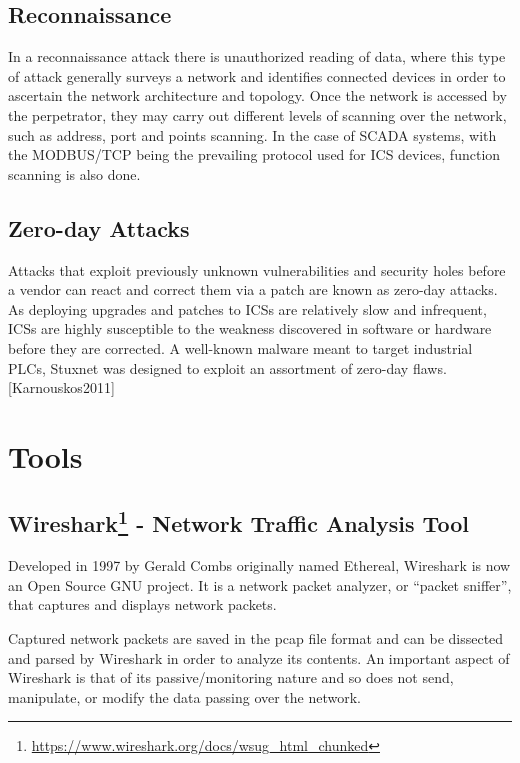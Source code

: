 \documentclass[12pt,]{article}
\begin{document}
\subsection{Reconnaissance}\label{reconnaissance}

In a reconnaissance attack there is unauthorized reading of data, where
this type of attack generally surveys a network and identifies connected
devices in order to ascertain the network architecture and topology.
Once the network is accessed by the perpetrator, they may carry out
different levels of scanning over the network, such as address, port and
points scanning. In the case of SCADA systems, with the MODBUS/TCP being
the prevailing protocol used for ICS devices, function scanning is also
done.

\subsection{Zero-day Attacks}\label{zero-day-attacks}

Attacks that exploit previously unknown vulnerabilities and security
holes before a vendor can react and correct them via a patch are known
as zero-day attacks. As deploying upgrades and patches to ICSs are
relatively slow and infrequent, ICSs are highly susceptible to the
weakness discovered in software or hardware before they are corrected. A
well-known malware meant to target industrial PLCs, Stuxnet was designed
to exploit an assortment of zero-day flaws.{[}Karnouskos2011{]}

\pagebreak

\section{Tools}\label{tools}

\subsection[Wireshark - Network Traffic Analysis
Tool]{Wireshark\footnote{\url{https://www.wireshark.org/docs/wsug_html_chunked}}
- Network Traffic Analysis
Tool}\label{wireshark2---network-traffic-analysis-tool}

Developed in 1997 by Gerald Combs originally named Ethereal, Wireshark
is now an Open Source GNU project. It is a network packet analyzer, or
``packet sniffer'', that captures and displays network packets.

Captured network packets are saved in the pcap file format and can be
dissected and parsed by Wireshark in order to analyze its contents. An
important aspect of Wireshark is that of its passive/monitoring nature
and so does not send, manipulate, or modify the data passing over the
network.
\end{document}
